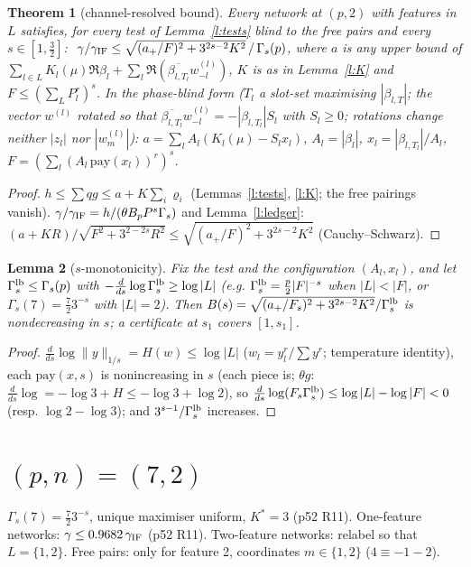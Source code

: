 \documentclass[11pt]{article}
\newtheorem{theorem}{Theorem}\newtheorem{lemma}[theorem]{Lemma}\newtheorem{proposition}[theorem]{Proposition}
\theoremstyle{remark}\newtheorem{remark}[theorem]{Remark}
\begin{document}
\begin{theorem}[channel-resolved bound]\label{t:main}
Every network at $(p,2)$ with features in $L$ satisfies, for every test of Lemma~\ref{l:tests} blind to the free pairs and every
$s\in[1,\frac32]$: $\ \gamma/\gamma_{\rm IF}\le\sqrt{(a_+/F)^2+3^{2s-2}K^2}\,/\,\Gamma_s(p)$, where $a$ is any upper bound of
$\sum_{l\in L}K_l(\mu)\Re\beta_l+\sum_l\Re(\overline{\beta_{l,T_l}}w^{(l)}_{-l})$, $K$ is as in Lemma~\ref{l:K} and $F\le(\sum_LP_l^r)^s$.
In the phase-blind form ($T_l$ a slot-set maximising $|\beta_{l,T}|$; the vector $w^{(l)}$ rotated so that
$\overline{\beta_{l,T_l}}w^{(l)}_{-l}=-|\beta_{l,T_l}|S_l$ with $S_l\ge0$; rotations change neither $|z_l|$ nor $|w^{(l)}_m|$):
$a=\sum_lA_l(K_l(\mu)-S_lx_l)$, $A_l=|\beta_l|$, $x_l=|\beta_{l,T_l}|/A_l$, $F=(\sum_l(A_l\,\mathrm{pay}(x_l))^r)^s$.
\end{theorem}
\begin{proof}
$h\le\sum qg\le a+K\sum_i\varrho_i$ (Lemmas~\ref{l:tests}, \ref{l:K}; the free pairings vanish).  $\gamma/\gamma_{\rm IF}=h/(\theta B_pP^s\Gamma_s)$ and
Lemma~\ref{l:ledger}: $(a+KR)/\sqrt{F^2+3^{2-2s}R^2}\le\sqrt{(a_+/F)^2+3^{2s-2}K^2}$ (Cauchy--Schwarz).
\end{proof}

\begin{lemma}[$s$-monotonicity]\label{l:smono}
Fix the test and the configuration $(A_l,x_l)$, and let $\Gamma^{\rm lb}_s\le\Gamma_s(p)$ with $-\frac{d}{ds}\log\Gamma^{\rm lb}_s\ge\log|L|$ (e.g.
$\Gamma^{\rm lb}_s=\frac p2|F|^{-s}$ when $|L|<|F|$, or $\Gamma_s(7)=\frac72 3^{-s}$ with $|L|=2$).  Then
$B(s)=\sqrt{(a_+/F_s)^2+3^{2s-2}K^2}/\Gamma^{\rm lb}_s$ is nondecreasing in $s$; a certificate at $s_1$ covers $[1,s_1]$.
\end{lemma}
\begin{proof}
$\frac{d}{ds}\log\|y\|_{1/s}=H(w)\le\log|L|$ ($w_l=y_l^r/\sum y^r$; temperature identity), each $\mathrm{pay}(x,s)$ is nonincreasing in $s$
(each piece is; $\theta g$: $\frac d{ds}\log=-\log3+H\le-\log3+\log2$), so $\frac{d}{ds}\log(F_s\Gamma^{\rm lb}_s)\le\log|L|-\log|F|<0$
(resp. $\log2-\log3$); and $3^{s-1}/\Gamma^{\rm lb}_s$ increases.
\end{proof}

\section*{$(p,n)=(7,2)$}
$\Gamma_s(7)=\frac723^{-s}$, unique maximiser uniform, $K^*=3$ (p52 R11).  One-feature networks: $\gamma\le0.9682\,\gamma_{\rm IF}$ (p52 R11).
Two-feature networks: relabel so that $L=\{1,2\}$.  Free pairs: only for feature 2, coordinates $m\in\{1,2\}$ ($4\equiv-1-2$).
\end{document}
